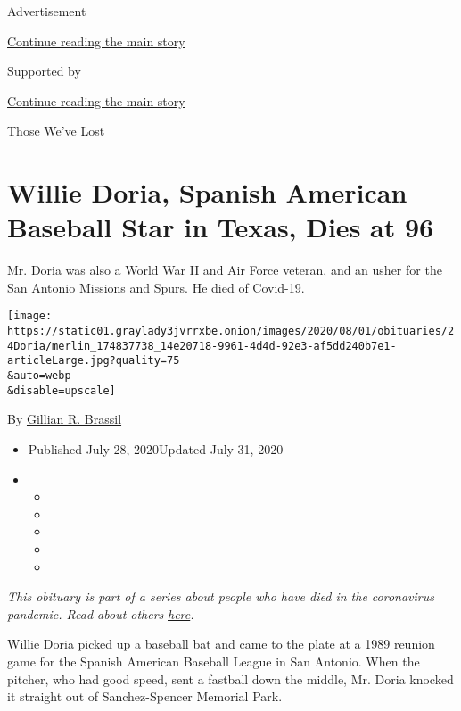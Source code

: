 Advertisement

\protect\hyperlink{after-top}{Continue reading the main story}

Supported by

\protect\hyperlink{after-sponsor}{Continue reading the main story}

Those We've Lost

\hypertarget{willie-doria-spanish-american-baseball-star-in-texas-dies-at-96}{%
\section{Willie Doria, Spanish American Baseball Star in Texas, Dies at
96}\label{willie-doria-spanish-american-baseball-star-in-texas-dies-at-96}}

Mr. Doria was also a World War II and Air Force veteran, and an usher
for the San Antonio Missions and Spurs. He died of Covid-19.

\texttt{[image: https://static01.graylady3jvrrxbe.onion/images/2020/08/01/obituaries/24Doria/merlin\_174837738\_14e20718-9961-4d4d-92e3-af5dd240b7e1-articleLarge.jpg?quality=75\\\&auto=webp\\\&disable=upscale]}

By
\href{https://www.nytimes3xbfgragh.onion/by/gillian-r--brassil}{Gillian
R. Brassil}

\begin{itemize}
\item
  Published July 28, 2020Updated July 31, 2020
\item
  \begin{itemize}
  \item
  \item
  \item
  \item
  \item
  \end{itemize}
\end{itemize}

\emph{This obituary is part of a series about people who have died in
the coronavirus pandemic. Read about others}
\href{https://www.nytimes3xbfgragh.onion/interactive/2020/obituaries/people-died-coronavirus-obituaries.html}{\emph{here}}\emph{.}

Willie Doria picked up a baseball bat and came to the plate at a 1989
reunion game for the Spanish American Baseball League in San Antonio.
When the pitcher, who had good speed, sent a fastball down the middle,
Mr. Doria knocked it straight out of Sanchez-Spencer Memorial Park.

